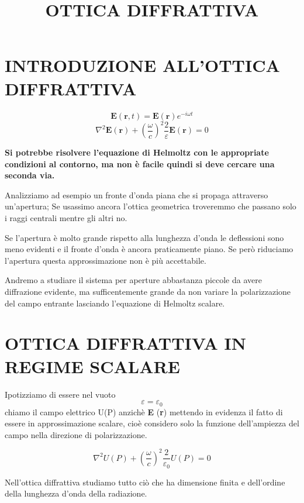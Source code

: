 \documentclass{article}
\begin{document}
\title{OTTICA DIFFRATTIVA}

\section{INTRODUZIONE ALL'OTTICA DIFFRATTIVA}
\begin{equation}
\textbf{E}(\textbf{r}, t)= \textbf{E}( \textbf{r} ) e^{-i \omega t}
\end{equation}
\begin{equation}
\nabla ^{2}\textbf{E} (\textbf{r}) + (\frac{\omega}{c})^{2}\frac{2}{\varepsilon}\textbf{E} (\textbf{r})=0
\end{equation}

\textbf{Si potrebbe risolvere l'equazione di Helmoltz con le appropriate condizioni al contorno, ma non è facile quindi si deve cercare una seconda via.}

Analizziamo ad esempio un fronte d'onda piana che si propaga attraverso un'apertura; Se usassimo ancora l'ottica geometrica troveremmo che passano solo i raggi centrali mentre gli altri no.

Se l'apertura è molto grande rispetto alla lunghezza d'onda le deflessioni sono meno evidenti e il fronte d'onda è ancora praticamente piano. Se però riduciamo l'apertura questa approssimazione non è più accettabile.

Andremo a studiare il sistema per aperture abbastanza piccole da avere diffrazione evidente, ma sufficentemente grande da non variare la polarizzazione del campo entrante lasciando l'equazione di Helmoltz scalare.

\section{OTTICA DIFFRATTIVA IN REGIME SCALARE}
Ipotizziamo di essere nel vuoto 
\begin{equation}
\varepsilon = \varepsilon_{0}
\end{equation}
chiamo il campo elettrico U(P) anzichè \textbf{E} (\textbf{r}) mettendo in evidenza il fatto di essere in approssimazione scalare, cioè considero solo la funzione dell'ampiezza del campo nella direzione di polarizzazione.

\begin{equation}
\nabla ^{2}U(P) + (\frac{\omega}{c})^{2}\frac{2}{\varepsilon _{0}}U(P)=0
\end{equation}

Nell'ottica diffrattiva studiamo tutto ciò che ha dimensione finita e dell'ordine della lunghezza d'onda della radiazione.
\end{document}
